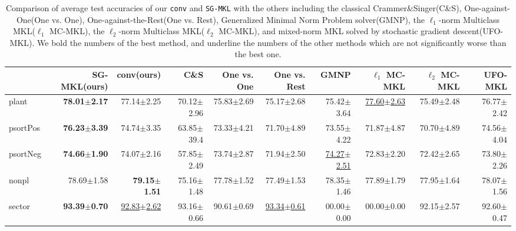 \documentclass{article}
\begin{document}
\begin{table*}[t]
\scriptsize
   \caption{
    \small Comparison of average test accuracies of our \texttt{conv} and \texttt{SG-MKL} with the others including
    the classical Crammer\&Singer(C\&S),
    One-against-One(One vs. One),
    One-against-the-Rest(One vs. Rest),
    Generalized Minimal Norm Problem solver(GMNP),
    the $\ell_1$-norm Multiclass MKL($\ell_1$ MC-MKL),
    the $\ell_2$-norm Multiclass MKL($\ell_2$ MC-MKL),
    and mixed-norm MKL solved by stochastic gradient descent(UFO-MKL).
    We bold the numbers of the best method, and underline the numbers of the other methods
    which are not significantly worse than the best one.
   }
   \label{tabel:accuracy}
    \begin{tabular*}{\linewidth}{@{\extracolsep{\fill}}lrrrrrrrrr}
    \toprule
                   & SG-MKL(ours)              & conv(ours)               & C\&S               & One vs. One              & One vs. Rest                                              & GMNP                      & $\ell_1$ MC-MKL          & $\ell_2$ MC-MKL    & UFO-MKL                  \\ \hline
plant              & \textbf{78.01$\pm$2.17}   &77.14$\pm$2.25            & 70.12$\pm$2.96     & 75.83$\pm$2.69           &75.17$\pm$2.68       &75.42$\pm$3.64    & \underline{77.60$\pm$2.63}&75.49$\pm$2.48            &76.77$\pm$2.42\\
psortPos           & \textbf{76.23$\pm$3.39}   &74.74$\pm$3.35            &63.85$\pm$39.4      &73.33$\pm$4.21            &71.70$\pm$4.89       & 73.55$\pm$4.22   &71.87$\pm$4.87             &70.70$\pm$4.89            &74.56$\pm$4.04\\
psortNeg           & \textbf{74.66$\pm$1.90}   &74.07$\pm$2.16            &57.85$\pm$2.49      &73.74$\pm$2.87            &71.94$\pm$2.50   &\underline{74.27$\pm$2.51}   &72.83$\pm$2.20                             &72.42$\pm$2.65      &73.80$\pm$2.26 \\
nonpl              &78.69$\pm$1.58             & \textbf{79.15$\pm$1.51}  &75.16$\pm$1.48      &77.78$\pm$1.52            &77.49$\pm$1.53 &78.35$\pm$1.46    &77.89$\pm$1.79             &77.95$\pm$1.64            &78.07$\pm$1.56\\
sector             & \textbf{93.39$\pm$0.70}   &\underline{92.83$\pm$2.62}&93.16$\pm$0.66      &90.61$\pm$0.69            &\underline{93.34$\pm$0.61}                    &00.00$\pm$0.00    &00.00$\pm$0.00             &92.15$\pm$2.57            &92.60$\pm$0.47\\

\end{tabular*}
\end{table*}
\end{document}
